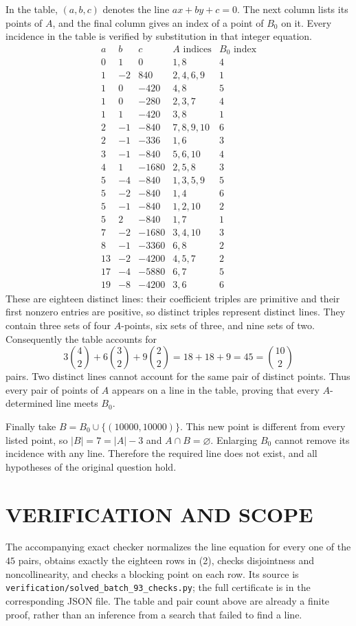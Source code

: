 In the table, $(a,b,c)$ denotes the line $ax+by+c=0$. The next column lists its points of $A$, and the final column gives an index of a point of $B_0$ on it. Every incidence in the table is verified by substitution in that integer equation.
\[
\begin{array}{r|r|r|l|c}
a&b&c&A\text{ indices}&B_0\text{ index}\\\hline
0&1&0&1,8&4\\
1&-2&840&2,4,6,9&1\\
1&0&-420&4,8&5\\
1&0&-280&2,3,7&4\\
1&1&-420&3,8&1\\
2&-1&-840&7,8,9,10&6\\
2&-1&-336&1,6&3\\
3&-1&-840&5,6,10&4\\
4&1&-1680&2,5,8&3\\
5&-4&-840&1,3,5,9&5\\
5&-2&-840&1,4&6\\
5&-1&-840&1,2,10&2\\
5&2&-840&1,7&1\\
7&-2&-1680&3,4,10&3\\
8&-1&-3360&6,8&2\\
13&-2&-4200&4,5,7&2\\
17&-4&-5880&6,7&5\\
19&-8&-4200&3,6&6
\end{array}
\tag{2}
\]
These are eighteen distinct lines: their coefficient triples are primitive and their first nonzero entries are positive, so distinct triples represent distinct lines. They contain three sets of four $A$-points, six sets of three, and nine sets of two. Consequently the table accounts for
\[
3\binom42+6\binom32+9\binom22=18+18+9=45=\binom{10}2
\]
pairs. Two distinct lines cannot account for the same pair of distinct points. Thus every pair of points of $A$ appears on a line in the table, proving that every $A$-determined line meets $B_0$.

Finally take $B=B_0\cup\{(10000,10000)\}$. This new point is different from every listed point, so $|B|=7=|A|-3$ and $A\cap B=\varnothing$. Enlarging $B_0$ cannot remove its incidence with any line. Therefore the required line does not exist, and all hypotheses of the original question hold.

\section{VERIFICATION AND SCOPE}
The accompanying exact checker normalizes the line equation for every one of the $45$ pairs, obtains exactly the eighteen rows in (2), checks disjointness and noncollinearity, and checks a blocking point on each row. Its source is \texttt{verification/solved\_batch\_93\_checks.py}; the full certificate is in the corresponding JSON file. The table and pair count above are already a finite proof, rather than an inference from a search that failed to find a line.

